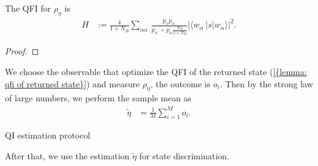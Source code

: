 \documentclass[../../note.tex]{subfiles}
\begin{document}
\begin{lemma}
    \label{lemma: qfi of returned state}
    The QFI for $\rho_{\eta}$ is
    \begin{align}
        H
        &:= \frac{4}{1+N_B} \sum_{\alpha \alpha^\prime} \frac{p_\alpha p_{\alpha^\prime}}{p_{\alpha^\prime} + p_{\alpha} \frac{N_B}{1+N_B}} \vert \langle w_{\alpha^\prime} \vert s \vert w_{\alpha} \rangle \vert^2.
    \end{align}
\end{lemma}
\begin{proof}
    
\end{proof}

We choose the observable that optimize the QFI of the returned state (\ref{{lemma: qfi of returned state}}) and measure $\rho_{\eta}$, the outcome is $o_i$. Then by the strong law of large numbers, we perform the sample mean as
\begin{align}
    \label{eq: estimation of eta}
    \tilde{\eta}
    &= \frac{1}{M} \sum_{i=1}^{M} o_i.
\end{align}

\begin{algorithm}[H]
    \caption{QI estimation protocol}
    \label{ptl: quantum illumination estimation protocol}
\end{algorithm}

After that, we use the estimation $\tilde{\eta}$ for state discrimination.
\end{document}
